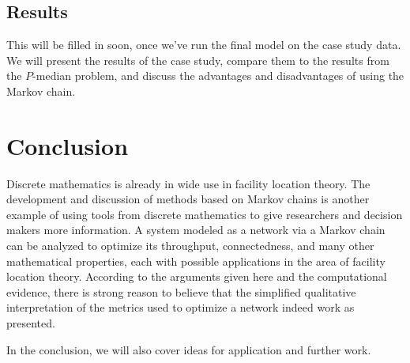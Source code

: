 \documentclass[twoside,twocolumn]{article}
\begin{document}

\subsection{Results}

This will be filled in soon, once we've run the final model on the case study data.
We will present the results of the case study, compare them to the results from the $P$-median problem, and discuss the advantages and disadvantages of using the Markov chain.









\section{Conclusion}

Discrete mathematics is already in wide use in facility location theory. %
The development and discussion of methods based on Markov chains is another example of using tools from discrete mathematics to give researchers and decision makers more information.
A system modeled as a network via a Markov chain can be analyzed to optimize its throughput, connectedness, and many other mathematical properties, each with possible applications in the area of facility location theory.
According to the arguments given here and the computational evidence, there is strong reason to believe that the simplified qualitative interpretation of the metrics used to optimize a network indeed work as presented.

In the conclusion, we will also cover ideas for application and further work.

\end{document}

